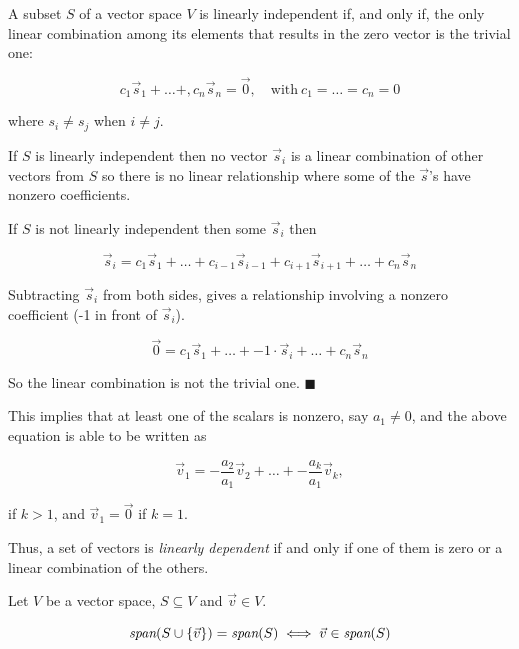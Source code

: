 \begin{tcolorbox}[colback=def_color,colframe=gray,coltext=black] \begin{lemma}
   A subset $S$ of a vector space $V$ is linearly independent if, and only if, the only linear combination among its elements that results in the zero vector is the trivial one:

   $$
   c_1 \vec s_1 + \dots +, c_n \vec s_n = \vec 0, \quad \text{with} \ c_1 = \dots = c_n = 0 
   $$

where $s_i \neq s_j$ when $i \neq j$.
\end{lemma}
\end{tcolorbox}

\begin{tcolorbox}[colback=def_color,coltitle=black,coltext=black,colframe=pro_color_back,title=\textbf{Proof}] 

If $S$ is linearly independent then no vector $\vec s_i$ is a linear combination
of other vectors from $S$ so there is no linear relationship where some of the $\vec s$’s
have nonzero coefficients.

If $S$ is not linearly independent then some $\vec s_i$ then

$$
\vec s_i = c_1 \vec s_1 + \dots + c_{i-1} \vec s_{i-1} + c_{i+1} \vec s_{i+1} + \dots + c_{n} \vec s_n
$$

Subtracting $\vec s_i$ from both sides, gives a relationship involving a nonzero coefficient (-1 in front of $\vec s_i$).

$$
\vec 0 = c_1 \vec s_1 + \dots + -1 \cdot \vec s_i + \dots + c_{n} \vec s_n
$$

So the linear combination is not the trivial one. $\blacksquare$
\end{tcolorbox}

This implies that at least one of the scalars is nonzero, say $a_1 \neq 0$, and the above equation is able to be written as

$$\vec{v}_1 = -\frac{a_2}{a_1} \vec{v}_2 + \ldots + -\frac{a_k}{a_1} \vec{v}_k,$$

if $k > 1$, and $\vec{v}_1 = \vec{0}$ if $k = 1$.

Thus, a set of vectors is \emph{linearly dependent} if and only if one of them is zero or a linear combination of the others.

\begin{tcolorbox}[colback=def_color,colframe=gray,coltext=black] \begin{lemma}
    Let $V$ be a vector space, $S \subseteq V$ and $\vec v \in V$. 
    
    $$\textit{span}{\normalfont (S \cup \{\vec v\}) = \textit{span}(S)} \iff \vec v \in \textit{span}{\normalfont (S)}
    $$
\end{lemma}
\end{tcolorbox}

